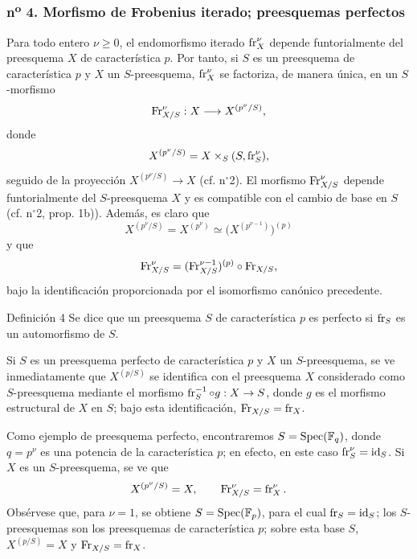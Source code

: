 \subsubsection*{n\textsuperscript{o} 4. Morfismo de Frobenius iterado; preesquemas perfectos}

Para todo entero $\nu\geq 0$, el endomorfismo iterado $\operatorname{fr}_X^\nu$ depende funtorialmente del preesquema $X$ de característica $p$. Por tanto, si $S$ es un preesquema de característica $p$ y $X$ un $S$-preesquema, $\operatorname{fr}_X^\nu$ se factoriza, de manera única, en un $S$-morfismo
\[
\operatorname{Fr}_{X/S}^\nu:X\longrightarrow X^{(p^\nu/S)},
\]
donde
\[
X^{(p^\nu/S)}=X\times_S(S,\operatorname{fr}_S^\nu),
\]
seguido de la proyección $X^{(p^\nu/S)}\to X$ (cf. n$^\circ$2). El morfismo $\operatorname{Fr}_{X/S}^\nu$ depende funtorialmente del $S$-preesquema $X$ y es compatible con el cambio de base en $S$ (cf. n$^\circ$2, prop. 1b)). Además, es claro que
\[
X^{(p^\nu/S)}=X^{(p^\nu)}\simeq\bigl(X^{(p^{\nu-1})}\bigr)^{(p)}
\]
y que
\[
\operatorname{Fr}_{X/S}^\nu=(\operatorname{Fr}_{X/S}^{\nu-1})^{(p)}\circ\operatorname{Fr}_{X/S},
\]
bajo la identificación proporcionada por el isomorfismo canónico precedente.

\begin{statement}{Definición 4}
Se dice que un preesquema $S$ de característica $p$ es perfecto si $\operatorname{fr}_S$ es un automorfismo de $S$.
\end{statement}

Si $S$ es un preesquema perfecto de característica $p$ y $X$ un $S$-preesquema, se ve inmediatamente que $X^{(p/S)}$ se identifica con el preesquema $X$ considerado como $S$-preesquema mediante el morfismo $\operatorname{fr}_S^{-1}\circ g:X\to S$, donde $g$ es el morfismo estructural de $X$ en $S$; bajo esta identificación, $\operatorname{Fr}_{X/S}=\operatorname{fr}_X$.

Como ejemplo de preesquema perfecto, encontraremos $S=\operatorname{Spec}(\mathbb F_q)$, donde $q=p^\nu$ es una potencia de la característica $p$; en efecto, en este caso $\operatorname{fr}_S^\nu=\operatorname{id}_S$. Si $X$ es un $S$-preesquema, se ve que
\[
X^{(p^\nu/S)}=X,
\qquad
\operatorname{Fr}_{X/S}^\nu=\operatorname{fr}_X^\nu.
\]
Obsérvese que, para $\nu=1$, se obtiene $S=\operatorname{Spec}(\mathbb F_p)$, para el cual $\operatorname{fr}_S=\operatorname{id}_S$; los $S$-preesquemas son los preesquemas de característica $p$; sobre esta base $S$, $X^{(p/S)}=X$ y $\operatorname{Fr}_{X/S}=\operatorname{fr}_X$.
